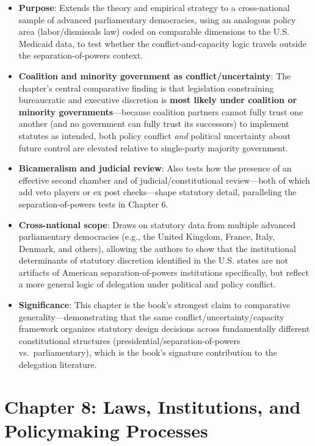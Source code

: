 \documentclass[12pt]{article}
\begin{document}
\begin{itemize}[leftmargin=*, itemsep=4pt]
    \item \textbf{Purpose}: Extends the theory and empirical strategy to a cross-national sample of advanced parliamentary democracies, using an analogous policy area (labor/dismissals law) coded on comparable dimensions to the U.S. Medicaid data, to test whether the conflict-and-capacity logic travels outside the separation-of-powers context.
    \item \textbf{Coalition and minority government as conflict/uncertainty}: The chapter's central comparative finding is that legislation constraining bureaucratic and executive discretion is \textbf{most likely under coalition or minority governments}---because coalition partners cannot fully trust one another (and no government can fully trust its successors) to implement statutes as intended, both policy conflict \emph{and} political uncertainty about future control are elevated relative to single-party majority government.
    \item \textbf{Bicameralism and judicial review}: Also tests how the presence of an effective second chamber and of judicial/constitutional review---both of which add veto players or ex post checks---shape statutory detail, paralleling the separation-of-powers tests in Chapter 6.
    \item \textbf{Cross-national scope}: Draws on statutory data from multiple advanced parliamentary democracies (e.g., the United Kingdom, France, Italy, Denmark, and others), allowing the authors to show that the institutional determinants of statutory discretion identified in the U.S. states are not artifacts of American separation-of-powers institutions specifically, but reflect a more general logic of delegation under political and policy conflict.
    \item \textbf{Significance}: This chapter is the book's strongest claim to comparative generality---demonstrating that the same conflict/uncertainty/capacity framework organizes statutory design decisions across fundamentally different constitutional structures (presidential/separation-of-powers vs.\ parliamentary), which is the book's signature contribution to the delegation literature.
\end{itemize}

\section{Chapter 8: Laws, Institutions, and Policymaking Processes}
\end{document}
